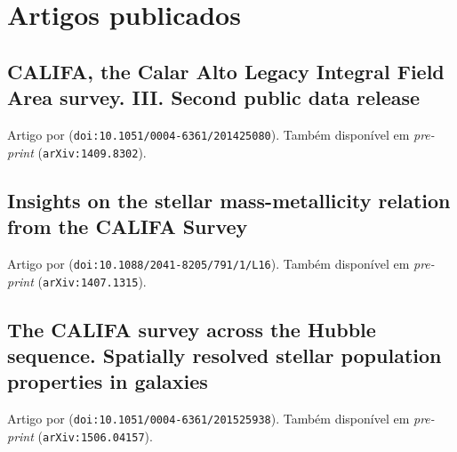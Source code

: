 


\chapter{Artigos publicados}

\section{CALIFA, the Calar Alto Legacy Integral Field Area survey. III. Second public data release}
\label{apendice:GBetal2015a}

Artigo por \cite{GarciaBenito.etal.2015a} (\texttt{doi:10.1051/0004-6361/201425080}).
Também disponível em {\em pre-print} (\texttt{arXiv:1409.8302}).

\cleardoublepage



\section{Insights on the stellar mass-metallicity relation from the CALIFA Survey}
\label{apendice:GDetal2014b}

Artigo por \cite{GonzalezDelgado.etal.2014b} (\texttt{doi:10.1088/2041-8205/791/1/L16}).
Também disponível em {\em pre-print} (\texttt{arXiv:1407.1315}).

\cleardoublepage



\section{The CALIFA survey across the Hubble sequence. Spatially resolved stellar population properties in galaxies}
\label{apendice:GDetal2015a}

Artigo por \cite{GonzalezDelgado.etal.2015a} (\texttt{doi:10.1051/0004-6361/201525938}).
Também disponível em {\em pre-print} (\texttt{arXiv:1506.04157}).

\cleardoublepage



